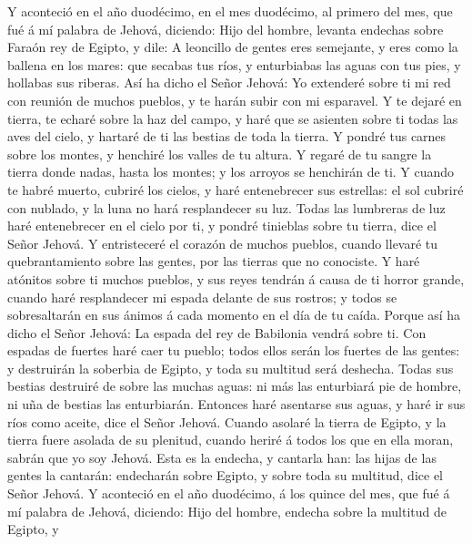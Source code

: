  Y aconteció en el año duodécimo, en el mes duodécimo, al
primero del mes, que fué á mí palabra de Jehová, diciendo:
 Hijo del hombre, levanta endechas sobre Faraón rey de
Egipto, y dile: A leoncillo de gentes eres semejante, y eres como la
ballena en los mares: que secabas tus ríos, y enturbiabas las aguas con
tus pies, y hollabas sus riberas.  Así ha dicho el Señor
Jehová: Yo extenderé sobre ti mi red con reunión de muchos pueblos, y te
harán subir con mi esparavel.  Y te dejaré en tierra, te
echaré sobre la haz del campo, y haré que se asienten sobre ti todas las
aves del cielo, y hartaré de ti las bestias de toda la tierra.
 Y pondré tus carnes sobre los montes, y henchiré los
valles de tu altura.  Y regaré de tu sangre la tierra
donde nadas, hasta los montes; y los arroyos se henchirán de ti.
 Y cuando te habré muerto, cubriré los cielos, y haré
entenebrecer sus estrellas: el sol cubriré con nublado, y la luna no
hará resplandecer su luz.  Todas las lumbreras de luz haré
entenebrecer en el cielo por ti, y pondré tinieblas sobre tu tierra,
dice el Señor Jehová.  Y entristeceré el corazón de muchos
pueblos, cuando llevaré tu quebrantamiento sobre las gentes, por las
tierras que no conociste.  Y haré atónitos sobre ti
muchos pueblos, y sus reyes tendrán á causa de ti horror grande, cuando
haré resplandecer mi espada delante de sus rostros; y todos se
sobresaltarán en sus ánimos á cada momento en el día de tu caída.
 Porque así ha dicho el Señor Jehová: La espada del rey
de Babilonia vendrá sobre ti.  Con espadas de fuertes
haré caer tu pueblo; todos ellos serán los fuertes de las gentes: y
destruirán la soberbia de Egipto, y toda su multitud será deshecha.
 Todas sus bestias destruiré de sobre las muchas aguas:
ni más las enturbiará pie de hombre, ni uña de bestias las enturbiarán.
 Entonces haré asentarse sus aguas, y haré ir sus ríos
como aceite, dice el Señor Jehová.  Cuando asolaré la
tierra de Egipto, y la tierra fuere asolada de su plenitud, cuando
heriré á todos los que en ella moran, sabrán que yo soy Jehová.
 Esta es la endecha, y cantarla han: las hijas de las
gentes la cantarán: endecharán sobre Egipto, y sobre toda su multitud,
dice el Señor Jehová.  Y aconteció en el año duodécimo, á
los quince del mes, que fué á mí palabra de Jehová, diciendo:
 Hijo del hombre, endecha sobre la multitud de Egipto, y
